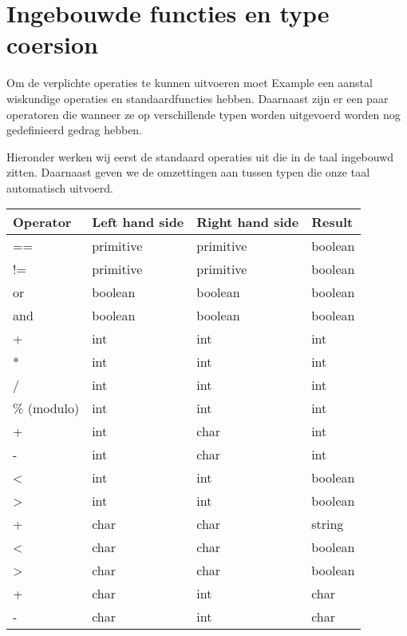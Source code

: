 \chapter{Ingebouwde functies en type coersion}
Om de verplichte operaties te kunnen uitvoeren moet Example een aanstal wiskundige operaties en standaardfuncties hebben. Daarnaast zijn er een paar operatoren die wanneer ze op verschillende typen worden uitgevoerd worden nog gedefinieerd gedrag hebben.

Hieronder werken wij eerst de standaard operaties uit die in de taal ingebouwd zitten. Daarnaast geven we de omzettingen aan tussen typen die onze taal automatisch uitvoerd.

\begin{tabular*}{0.75\textwidth}{ |l | l | l | l |}
	\hline
		Operator	&	Left hand side	&	Right hand side	&	Result	\\
	\hline
		==			&	primitive	&	primitive	& boolean \\
		!=			&	primitive	&	primitive	& boolean	\\
		
		or			&	boolean	&	boolean	&	boolean	\\
		and			&	boolean	&	boolean	&	boolean	\\
		
		+			&		int	&		int		& 	int	\\
		*			&		int	&		int	&	int \\
		/			&		int	&		int	&	int \\
		\% (modulo)	&		int	&		int	&	int	\\
		
		+			&		int	&		char&	int	\\
		-			&		int	&		char&	int	\\
		
		<			&		int	&		int	&	boolean	\\
		>			&		int	&		int	&	boolean	\\
		
		+			&		char &		char &	string	\\
		<			&		char &		char &	boolean	\\
		>			&		char &		char &	boolean	\\
		
		+			&		char &		int	&	char	\\
		-			&		char &		int	&	char	\\
\end{tabular*}
